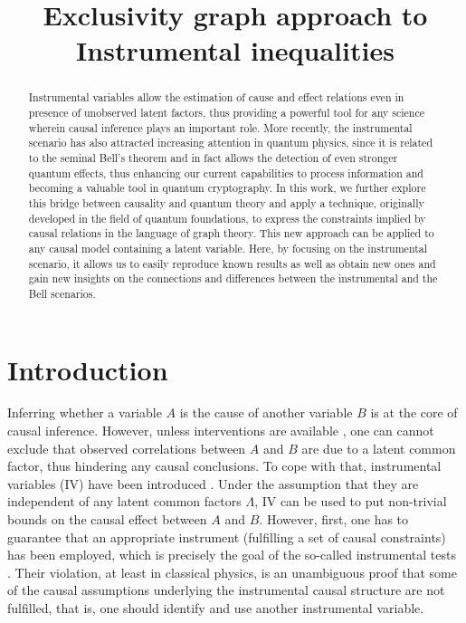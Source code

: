 \documentclass[letterpaper]{article}
\title{Exclusivity graph approach to Instrumental inequalities}
\author{} %
\begin{document}
\maketitle

\begin{abstract}
Instrumental variables allow the estimation of cause and effect relations even
in presence of unobserved latent factors, thus providing a powerful tool for any
science wherein causal inference plays an important role. More recently, the
instrumental scenario has also attracted increasing attention in quantum
physics, since it is related to the seminal Bell's theorem and in fact allows
the detection of even stronger quantum effects, thus enhancing our current
capabilities to process information and becoming a valuable tool in quantum
cryptography. In this work, we further explore this bridge between causality and
quantum theory and apply a technique, originally developed in the field of
quantum foundations, to express the constraints implied by causal relations in
the language of graph theory. This new approach can be applied to any causal
model containing a latent variable. Here, by focusing on the instrumental
scenario, it allows us to easily reproduce known results as well as obtain new
ones and gain new insights on the connections and differences between the
instrumental and the Bell scenarios. 
\end{abstract}

\section{Introduction}
Inferring  whether a variable $A$ is the cause of another variable $B$ is at the
core of causal inference. However, unless interventions are available
\cite{pearlbook}, one can cannot exclude that observed correlations between $A$
and $B$ are due to a latent common factor, thus hindering any causal
conclusions. To cope with that, instrumental variables (IV) have been introduced
\cite{pearl1995, bonet2001}. Under the assumption that they are independent of
any latent common factors $\Lambda$, IV can be used to put non-trivial bounds on the
causal effect between $A$ and $B$. However, first, one has to guarantee that
an appropriate instrument (fulfilling a set of causal constraints) has been
employed, which is precisely the goal of the so-called instrumental tests
\cite{pearl1995, bonet2001,Ramsahai2012,Kedagni2017}. Their violation, at least in classical physics, is
an unambiguous proof that some of the causal assumptions underlying the
instrumental causal structure are not fulfilled, that is, one should identify
and use another instrumental variable.
\end{document}
